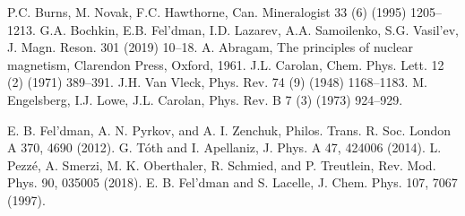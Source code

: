 \begin{thebibliography}{}
 P.C. Burns, M. Novak, F.C. Hawthorne, Can. Mineralogist 33 (6) (1995) 1205– 1213.
 G.A. Bochkin, E.B. Fel’dman, I.D. Lazarev, A.A. Samoilenko, S.G. Vasil’ev, J. Magn. Reson. 301 (2019) 10–18.
 A. Abragam, The principles of nuclear magnetism, Clarendon Press, Oxford, 1961.
 J.L. Carolan, Chem. Phys. Lett. 12 (2) (1971) 389–391.
 J.H. Van Vleck, Phys. Rev. 74 (9) (1948) 1168–1183.
 M. Engelsberg, I.J. Lowe, J.L. Carolan, Phys. Rev. B 7 (3) (1973) 924–929.


 E. B. Fel’dman, A. N. Pyrkov, and A. I. Zenchuk, Philos. Trans. R. Soc. London A 370, 4690 (2012).
 G. T\'oth and I. Apellaniz, J. Phys. A 47, 424006 (2014).
 L. Pezz\'e, A. Smerzi, M. K. Oberthaler, R. Schmied, and P. Treutlein, Rev. Mod. Phys. 90, 035005 (2018).
 E. B. Fel'dman and S. Lacelle, J. Chem. Phys. 107, 7067 (1997).

\end{thebibliography}
